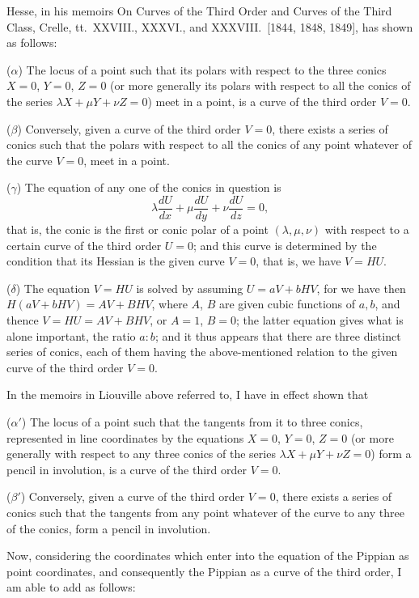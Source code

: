 \documentclass[11pt]{article}
\begin{document}
Hesse, in his memoirs On Curves of the Third Order and Curves of the Third Class, Crelle, tt.~XXVIII., XXXVI., and XXXVIII.\ [1844, 1848, 1849], has shown as follows:

($\alpha$) The locus of a point such that its polars with respect to the three conics $X = 0$, $Y = 0$, $Z = 0$ (or more generally its polars with respect to all the conics of the series $\lambda X + \mu Y + \nu Z = 0$) meet in a point, is a curve of the third order $V = 0$.

($\beta$) Conversely, given a curve of the third order $V = 0$, there exists a series of conics such that the polars with respect to all the conics of any point whatever of the curve $V = 0$, meet in a point.

($\gamma$) The equation of any one of the conics in question is
\[
\lambda\frac{dU}{dx} + \mu\frac{dU}{dy} + \nu\frac{dU}{dz} = 0,
\]
that is, the conic is the first or conic polar of a point $(\lambda, \mu, \nu)$ with respect to a certain curve of the third order $U = 0$; and this curve is determined by the condition that its Hessian is the given curve $V = 0$, that is, we have $V = HU$.

($\delta$) The equation $V = HU$ is solved by assuming $U = a V + b H V$, for we have then $H(a V + b H V) = A V + B H V$, where $A$, $B$ are given cubic functions of $a, b$, and thence $V = HU = A V + B H V$, or $A = 1$, $B = 0$; the latter equation gives what is alone important, the ratio $a : b$; and it thus appears that there are three distinct series of conics, each of them having the above-mentioned relation to the given curve of the third order $V = 0$.

In the memoirs in Liouville above referred to, I have in effect shown that

($\alpha'$) The locus of a point such that the tangents from it to three conics, represented in line coordinates by the equations $X = 0$, $Y = 0$, $Z = 0$ (or more generally with respect to any three conics of the series $\lambda X + \mu Y + \nu Z = 0$) form a pencil in involution, is a curve of the third order $V = 0$.

($\beta'$) Conversely, given a curve of the third order $V = 0$, there exists a series of conics such that the tangents from any point whatever of the curve to any three of the conics, form a pencil in involution.

Now, considering the coordinates which enter into the equation of the Pippian as point coordinates, and consequently the Pippian as a curve of the third order, I am able to add as follows:
\end{document}
